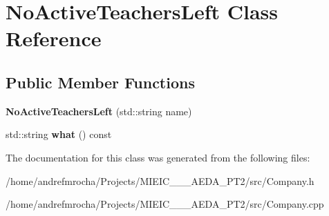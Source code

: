 \hypertarget{class_no_active_teachers_left}{}\section{No\+Active\+Teachers\+Left Class Reference}
\label{class_no_active_teachers_left}
\subsection*{Public Member Functions}
\begin{DoxyCompactItemize}
\item 
\mbox{\label{class_no_active_teachers_left_aad05df1f29604757084eb13bbabbfe9e}} 
{\bfseries No\+Active\+Teachers\+Left} (std\+::string name)
\item 
\mbox{\label{class_no_active_teachers_left_a2760ee32e2c9e4d7dc6e2844a947eaaa}} 
std\+::string {\bfseries what} () const
\end{DoxyCompactItemize}


The documentation for this class was generated from the following files\+:\begin{DoxyCompactItemize}
\item 
/home/andrefmrocha/\+Projects/\+M\+I\+E\+I\+C\+\_\+\_\+\_\+\+A\+E\+D\+A\+\_\+\+P\+T2/src/Company.\+h\item 
/home/andrefmrocha/\+Projects/\+M\+I\+E\+I\+C\+\_\+\_\+\_\+\+A\+E\+D\+A\+\_\+\+P\+T2/src/Company.\+cpp\end{DoxyCompactItemize}
